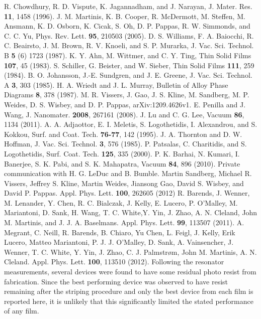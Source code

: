 \documentclass{report}
\begin{document}
\begin{thebibliography}{99}
R. Chowdhury, R. D. Vispute, K. Jagannadham, and J. Narayan, J. Mater. Res. \textbf{11}, 1458 (1996).
J. M. Martinis, K. B. Cooper, R. McDermott, M. Steffen, M. Ansmann, K. D. Osborn, K. Cicak, S. Oh, D. P. Pappas, R. W. Simmonds, and C. C. Yu, Phys. Rev. Lett. \textbf{95}, 210503 (2005).
D. S. Williams, F. A. Baiocchi, R. C. Beairsto, J. M. Brown, R. V. Knoeli, and S. P. Murarka, J. Vac. Sci. Technol. B \textbf{5} (6) 1723 (1987).
K. Y. Ahn, M. Wittmer, and C. Y. Ting, Thin Solid Films \textbf{107}, 45 (1983).
S. Schiller, G. Beister, and W. Sieber, Thin Solid Films \textbf{111}, 259 (1984).
B. O. Johansson, J.-E. Sundgren, and J. E. Greene, J. Vac. Sci. Technol. A \textbf{3}, 303 (1985).
H. A. Wriedt and J. L. Murray, Bulletin of Alloy Phase Diagrams \textbf{8}, 378 (1987).
M. R. Vissers, J. Gao, J. S. Kline, M. Sandberg, M. P. Weides, D. S. Wisbey, and D. P. Pappas, arXiv:1209.4626v1.
E. Penilla and J. Wang, J. Nanomater. \textbf{2008}, 267161 (2008).
J. Lu and C. G. Lee, Vacuum \textbf{86}, 1134 (2011).
A. A. Adjaottor, E. I. Meletis, S. Logothetidis, I. Alexandrou, and S. Kokkou, Surf. and Coat. Tech. \textbf{76-77}, 142 (1995).
J. A. Thornton and D. W. Hoffman, J. Vac. Sci. Technol. \textbf{3}, 576 (1985).
P. Patsalas, C. Charitidis, and S. Logothetidis, Surf. Coat. Tech. \textbf{125}, 335 (2000).
P. K. Barhai, N. Kumari, I. Banerjee, S. K. Pabi, and S. K. Mahapatra, Vacuum \textbf{84}, 896 (2010).
 Private communication with H. G. LeDuc and B. Bumble.
Martin Sandberg, Michael R. Vissers, Jeffrey S. Kline, Martin Weides, Jiansong Gao, David S. Wisbey, and David P. Pappas. Appl. Phys. Lett. \textbf{100}, 262605 (2012)
R. Barends, J. Wenner, M. Lenander, Y. Chen, R. C. Bialczak, J. Kelly, E. Lucero, P. O'Malley,  M. Mariantoni, D. Sank, H. Wang, T. C. White,Y. Yin, J. Zhao, A. N. Cleland, John M. Martinis, and J. J. A. Baselmans.  Appl. Phys. Lett. \textbf{99}, 113507 (2011).
A. Megrant, C. Neill, R. Barends, B. Chiaro, Yu Chen, L. Feigl, J. Kelly, Erik Lucero, Matteo Mariantoni, P. J. J. O'Malley, D. Sank, A. Vainsencher, J. Wenner, T. C. White, Y. Yin, J. Zhao, C. J. Palmstr\o m, John M. Martinis, A. N. Cleland.  Appl. Phys. Lett. \textbf{100}, 113510 (2012).
 Following the resonator measurements, several devices were found to have some residual photo resist from fabrication.  Since the best performing device was observed to have resist remaining after the striping procedure and only the best device from each film is reported here, it is unlikely that this significantly limited the stated performance of any film.

\end{thebibliography}
\end{document}
